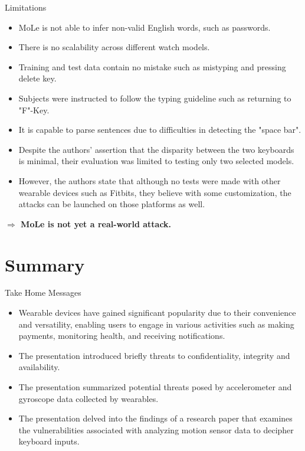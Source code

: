 \documentclass[ucs,9pt,usenames,dvipsnames]{beamer}
\begin{document}
\begin{frame}{Limitations}
\begin{itemize}
	\item MoLe is not able to infer non-valid English words, such as passwords.
\item There is no scalability across different watch models.
\item Training and test data contain no mistake such as mistyping and pressing delete key.
\item Subjects were instructed to follow the typing guideline such as returning to "F"-Key.
\item It is capable to parse sentences due to difficulties in detecting the "space bar".
\item Despite the authors' assertion that the disparity between the two keyboards is minimal, their evaluation was limited to testing only two selected models.
\item However, the authors state that although no tests were made with other wearable devices such as Fitbits, they believe with some customization, the attacks can be launched on those platforms as well.
\end{itemize}
	\pause 	
	
	\textbf{   \alert{$\Rightarrow$ MoLe is not yet a real-world attack.}}
\end{frame}






\section*{Summary}

\begin{frame}{Take Home Messages}


  \begin{itemize}
  \item Wearable devices have gained significant
  popularity due to their convenience and versatility, enabling
  users to engage in various activities such as making payments,
  monitoring health, and receiving notifications.
  
  \item The presentation introduced briefly threats to confidentiality, integrity and availability.
  
  \item The presentation summarized potential threats  posed by accelerometer and gyroscope data collected by  wearables.
  
  \item The presentation delved
  into the findings of a research paper that examines the vulnerabilities associated with analyzing motion sensor data to
  decipher keyboard inputs.
  \end{itemize}
\end{frame}
\end{document}
